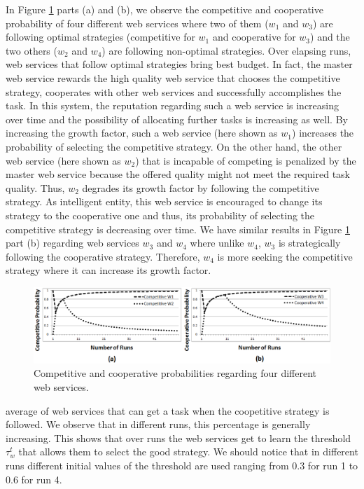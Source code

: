 \documentclass[runningheads,a4paper]{llncs}
\begin{document}
In Figure \ref{Graph2} parts (a) and (b), we observe the
competitive and cooperative probability of four different web
services where two of them ($w_1$ and $w_3$) are following optimal
strategies (competitive for $w_1$ and cooperative for $w_3$) and
the two others ($w_2$ and $w_4$) are following non-optimal
strategies. Over elapsing runs, web services that follow optimal
strategies bring best budget. In fact, the master web service
rewards the high quality web service that chooses the competitive
strategy, cooperates with other web services and successfully
accomplishes the task. In this system, the reputation regarding
such a web service is increasing over time and the possibility of
allocating further tasks is increasing as well. By increasing the
growth factor, such a web service (here shown as $w_1$) increases
the probability of selecting the competitive strategy. On the
other hand, the other web service (here shown as $w_2$) that is
incapable of competing is penalized by the master web service
because the offered quality might not meet the required task
quality. Thus, $w_2$ degrades its growth factor by following the
competitive strategy. As intelligent entity, this web service is
encouraged to change its strategy to the cooperative one and thus,
its probability of selecting the competitive strategy is
decreasing over time. We have similar results in Figure
\ref{Graph2} part (b) regarding web services $w_3$ and $w_4$ where
unlike $w_4$, $w_3$ is strategically following the cooperative
strategy. Therefore, $w_4$ is more seeking the competitive
strategy where it can increase its growth factor.

\begin{figure}%
\centering
\includegraphics[scale=0.31]{Graph2.eps}
\caption{Competitive and cooperative probabilities regarding four
different web services.} \label{Graph2}
\end{figure}
average of web services that can get a task when the coopetitive
strategy is followed. We observe that in different runs, this
percentage is generally increasing. This shows that over runs the
web services get to learn the threshold $\tau_w^t$ that allows
them to select the good strategy. We should notice that in
different runs different initial values of the threshold are used
ranging from $0.3$ for run 1 to $0.6$ for run 4.
\end{document}
